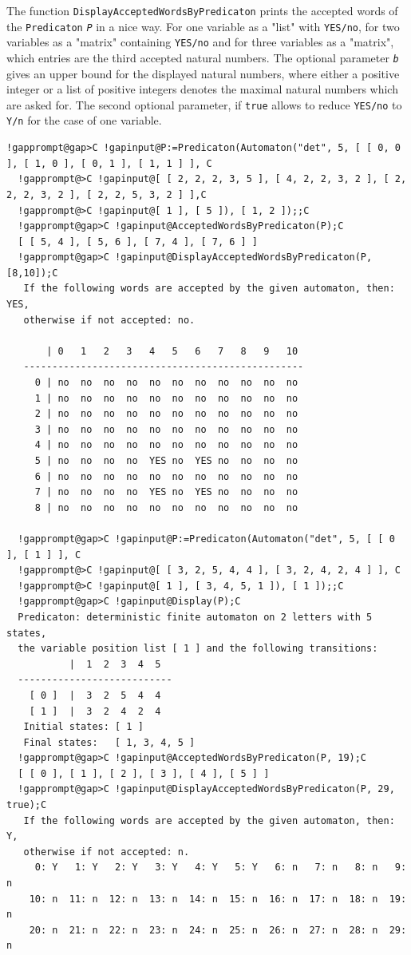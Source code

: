 \documentclass[a4paper,11pt]{report}
\begin{document}
{{{ The function \texttt{DisplayAcceptedWordsByPredicaton} prints the accepted words of the \texttt{Predicaton} \mbox{\texttt{\mdseries\slshape P}} in a nice way. For one variable as a "list" with \texttt{YES/no}, for two variables as a "matrix" containing \texttt{YES/no} and for three variables as a "matrix", which entries are the third accepted
natural numbers. The optional parameter \mbox{\texttt{\mdseries\slshape b}} gives an upper bound for the displayed natural numbers, where either a
positive integer or a list of positive integers denotes the maximal natural
numbers which are asked for. The second optional parameter, if \texttt{true} allows to reduce \texttt{YES/no} to \texttt{Y/n} for the case of one variable. 
\begin{Verbatim}[commandchars=!@C,fontsize=\small,frame=single,label=Example]
  !gapprompt@gap>C !gapinput@P:=Predicaton(Automaton("det", 5, [ [ 0, 0 ], [ 1, 0 ], [ 0, 1 ], [ 1, 1 ] ], C
  !gapprompt@>C !gapinput@[ [ 2, 2, 2, 3, 5 ], [ 4, 2, 2, 3, 2 ], [ 2, 2, 2, 3, 2 ], [ 2, 2, 5, 3, 2 ] ],C
  !gapprompt@>C !gapinput@[ 1 ], [ 5 ]), [ 1, 2 ]);;C
  !gapprompt@gap>C !gapinput@AcceptedWordsByPredicaton(P);C
  [ [ 5, 4 ], [ 5, 6 ], [ 7, 4 ], [ 7, 6 ] ]  
  !gapprompt@gap>C !gapinput@DisplayAcceptedWordsByPredicaton(P, [8,10]);C
   If the following words are accepted by the given automaton, then: YES,
   otherwise if not accepted: no.
  
       | 0   1   2   3   4   5   6   7   8   9   10  
   -------------------------------------------------
     0 | no  no  no  no  no  no  no  no  no  no  no  
     1 | no  no  no  no  no  no  no  no  no  no  no  
     2 | no  no  no  no  no  no  no  no  no  no  no  
     3 | no  no  no  no  no  no  no  no  no  no  no  
     4 | no  no  no  no  no  no  no  no  no  no  no  
     5 | no  no  no  no  YES no  YES no  no  no  no  
     6 | no  no  no  no  no  no  no  no  no  no  no  
     7 | no  no  no  no  YES no  YES no  no  no  no  
     8 | no  no  no  no  no  no  no  no  no  no  no
     
  !gapprompt@gap>C !gapinput@P:=Predicaton(Automaton("det", 5, [ [ 0 ], [ 1 ] ], C
  !gapprompt@>C !gapinput@[ [ 3, 2, 5, 4, 4 ], [ 3, 2, 4, 2, 4 ] ], C
  !gapprompt@>C !gapinput@[ 1 ], [ 3, 4, 5, 1 ]), [ 1 ]);;C
  !gapprompt@gap>C !gapinput@Display(P);C
  Predicaton: deterministic finite automaton on 2 letters with 5 states, 
  the variable position list [ 1 ] and the following transitions:
           |  1  2  3  4  5  
  ---------------------------
    [ 0 ]  |  3  2  5  4  4  
    [ 1 ]  |  3  2  4  2  4  
   Initial states: [ 1 ]
   Final states:   [ 1, 3, 4, 5 ]
  !gapprompt@gap>C !gapinput@AcceptedWordsByPredicaton(P, 19);C
  [ [ 0 ], [ 1 ], [ 2 ], [ 3 ], [ 4 ], [ 5 ] ]
  !gapprompt@gap>C !gapinput@DisplayAcceptedWordsByPredicaton(P, 29, true);C
   If the following words are accepted by the given automaton, then: Y,
   otherwise if not accepted: n.
     0: Y   1: Y   2: Y   3: Y   4: Y   5: Y   6: n   7: n   8: n   9: n
    10: n  11: n  12: n  13: n  14: n  15: n  16: n  17: n  18: n  19: n
    20: n  21: n  22: n  23: n  24: n  25: n  26: n  27: n  28: n  29: n
  

\end{Verbatim}}}}
\end{document}
